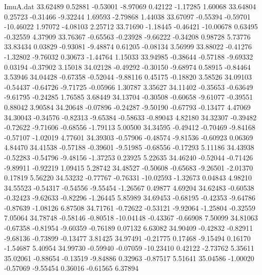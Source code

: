 \begin{filecontents}{ImuA.dat}
  33.62489    0.52881   -0.53001   -8.97069    0.42122   -1.17285    1.60068
  33.64804    0.25723   -0.31466   -9.32244    1.69593   -2.79868    1.44038
  33.67097   -0.55394   -0.59701  -10.46022    1.97072   -4.08103    2.25712
  33.71690   -1.18445   -0.46421  -10.00678    0.63495   -0.32559    4.37909
  33.76367   -0.65563   -0.23928   -9.66222   -0.34208    0.98728    5.73776
  33.83434    0.03829   -0.93081   -9.48874    0.61205   -0.08134    3.56999
  33.88022   -0.41276   -1.32802   -9.76032    0.30673   -1.44764    1.15033
  33.94985   -0.38644   -0.57188   -9.69332    0.03194   -0.37902    3.15018
  34.02128   -0.49292   -0.30150   -9.68974    0.58915   -0.84464    3.53946
  34.04428   -0.67358   -0.52044   -9.88116    0.45175   -0.18820    3.58526
  34.09103   -0.54437   -0.64726   -9.71725   -0.05966    1.30787    3.35627
  34.11402   -0.35653   -0.63649   -9.61795   -0.24285    1.76585    3.68449
  34.13704   -0.30508   -0.60658   -9.61077   -0.39551    0.88042    3.90584
  34.20648   -0.07896   -0.24287   -9.50190   -0.67793   -0.13477    4.47069
  34.30043   -0.34576   -0.82313   -9.65384   -0.58633   -0.89043    4.82180
  34.32307   -0.39482   -0.72622   -9.71606   -0.68556   -1.79113    5.00500
  34.34595   -0.49412   -0.70469   -9.84168   -0.57107   -1.02019    4.77601
  34.39303   -0.57906   -0.48574   -9.81536   -0.60923    0.06369    4.84470
  34.41538   -0.57188   -0.39601   -9.51985   -0.68556   -0.17293    5.11186
  34.43938   -0.52283   -0.54796   -9.48156   -1.37253    0.23925    5.22635
  34.46240   -0.52044   -0.71426   -9.89911   -0.92219    1.09415    5.28742
  34.48527   -0.50608   -0.65683   -9.26501   -2.01370    0.17819    5.56220
  34.53232   -0.77767   -0.76331  -10.02593   -1.32673    0.04843    4.98210
  34.55523   -0.54317   -0.54556   -9.55454   -1.26567    0.49877    4.69204
  34.62483   -0.60538   -0.32423   -9.62633   -0.82296   -1.26445    5.85989
  34.69453   -0.68195   -0.42353   -9.64786   -0.87639   -1.08126    6.87508
  34.71761   -0.72622   -0.53121   -9.92064   -1.25804   -0.32559    7.05064
  34.78748   -0.58146   -0.80518  -10.04148   -0.43367   -0.66908    7.50099
  34.81063   -0.67358   -0.81954   -9.60359   -0.76189    0.07132    6.63082
  34.90409   -0.42832   -0.82911   -9.68136   -0.73899   -0.13477    3.81425
  34.97491   -0.21775    0.17468   -9.15494    0.16170   -1.54687    5.40954
  34.99730   -0.59940   -0.07059  -10.23410    0.42122   -2.73762    5.35611
  35.02061   -0.88654   -0.13519   -9.84886    0.32963   -0.87517    5.51641
  35.04586   -1.00020   -0.57069   -9.55454    0.36016   -0.61565    6.37894

\end{filecontents}
